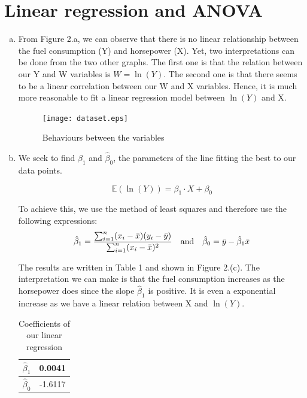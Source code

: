 \documentclass[a4paper]{article}
\begin{document}

\newpage

\section{Linear regression and ANOVA}

\begin{enumerate}[(a)]

\item From Figure 2.a, we can observe that there is no linear relationship between the fuel consumption (Y) and horsepower (X). Yet, two interpretations can be done from the two other graphs. The first one is that the relation between our Y and W variables is $W = \ln(Y)$. The second one is that there seems to be a linear correlation between our W and X variables. Hence, it is much more reasonable to fit a linear regression model between $\ln(Y)$ and X.

\begin{figure}
    \centering
    \texttt{[image: dataset.eps]}
    \caption{Behaviours between the variables}
\end{figure}

\item We seek to find $\hat{\beta}_1$ and $\hat{\beta}_0$, the parameters of the line fitting the best to our data points. 

$$\mathbb{E}(\ln(Y)) = \beta_1 \cdot X + \beta_0$$

To achieve this, we use the method of least squares and therefore use the following expressions:
$$\hat{\beta}_1 = \frac{\sum_{i=1}^{n}(x_i-\bar{x})(y_i-\bar{y})}{\sum_{i=1}^n(x_i-\bar{x})^2}
\quad \textup{and} \quad \hat{\beta}_0 = \bar{y} - \hat{\beta}_1 \bar{x}$$

The results are written in Table 1 and shown in Figure 2.(c). The interpretation we can make is that the fuel consumption increases as the horsepower does since the slope $\hat{\beta}_1$ is positive. It is even a exponential increase as we have a linear relation between X and $\ln(Y)$.

\begin{table}[h]
    \begin{centering}
    \begin{tabular}{|c|c|}
    \hline 
    $\hat{\beta}_1$ & 0.0041\tabularnewline
    \hline 
    $\hat{\beta}_0$ & -1.6117\tabularnewline
    \hline 
    \end{tabular}
    \par\end{centering}
    \caption{Coefficients of our linear regression}
\end{table}


\end{enumerate}
\end{document}
